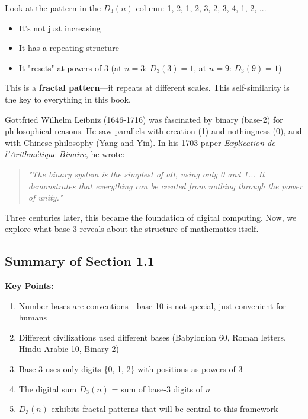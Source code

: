 \begin{intuitive}
Look at the pattern in the $D_3(n)$ column: 1, 2, 1, 2, 3, 2, 3, 4, 1, 2, ...

\begin{itemize}
\item It's not just increasing
\item It has a repeating structure
\item It "resets" at powers of 3 (at $n=3$: $D_3(3)=1$, at $n=9$: $D_3(9)=1$)
\end{itemize}

This is a \textbf{fractal pattern}—it repeats at different scales. This self-similarity is the key to everything in this book.
\end{intuitive}

\begin{historicalnote}
Gottfried Wilhelm Leibniz (1646-1716) was fascinated by binary (base-2) for philosophical reasons. He saw parallels with creation (1) and nothingness (0), and with Chinese philosophy (Yang and Yin). In his 1703 paper \textit{Explication de l'Arithmétique Binaire}, he wrote:

\begin{quote}
\textit{"The binary system is the simplest of all, using only 0 and 1... It demonstrates that everything can be created from nothing through the power of unity."}
\end{quote}

Three centuries later, this became the foundation of digital computing. Now, we explore what base-3 reveals about the structure of mathematics itself.
\end{historicalnote}

\subsection{Summary of Section 1.1}

\textbf{Key Points:}
\begin{enumerate}
\item Number bases are conventions—base-10 is not special, just convenient for humans
\item Different civilizations used different bases (Babylonian 60, Roman letters, Hindu-Arabic 10, Binary 2)
\item Base-3 uses only digits \{0, 1, 2\} with positions as powers of 3
\item The digital sum $D_3(n)$ = sum of base-3 digits of $n$
\item $D_3(n)$ exhibits fractal patterns that will be central to this framework
\end{enumerate}

